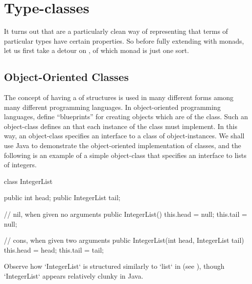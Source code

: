 \section{Type-classes}
\label{sec:type-classes}

It turns out that  are a particularly clean way of representing that terms of particular types have certain properties.
So before fully extending \LangA with monads, let us first take a detour on , of which monad is just one sort.

\subsection{Object-Oriented Classes}

The concept of having a  of structures is used in many different forms among many different programming languages.
In object-oriented programming languages,  define ``blueprints'' for creating objects which are  of the class.
Such an object-class defines an  that each instance of the class must implement.
In this way, an object-class specifies an interface to a class of object-instances.
We shall use Java to demonstrate the object-oriented implementation of classes, and the following is an example of a simple object-class that specifies an interface to lists of integers.
\begin{snippet-Java}
class IntegerList {
  public int head;
  public IntegerList tail;

  // nil, when given no arguments
  public IntegerList() {
    this.head = null;
    this.tail = null;
  }

  // cons, when given two arguments
  public IntegerList(int head, IntegerList tail) {
    this.head = head;
    this.tail = tail;
  }
}
\end{snippet-Java}
Observe how \code`IntegerList` is structured similarly to \code`list` in \LangA (see \prelude{\LangA}), though \code`IntegerList` appears relatively clunky in Java.



